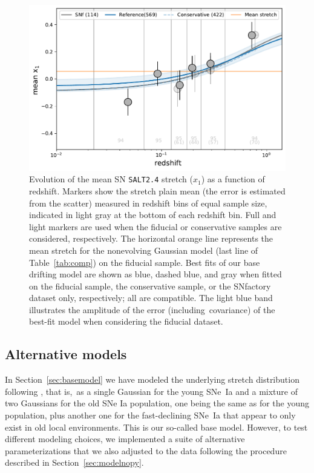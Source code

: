 \documentclass[]{aa}
\begin{document}
\begin{figure}
    \centering
    \includegraphics[width=0.7\linewidth]{Article_figures/stretchevol_all_vs_snf-mean.pdf}
    \caption{Evolution of the mean SN \textsc{\texttt{SALT2.4}} stretch ($x_1$)
        as a function of redshift. Markers show the stretch plain mean
        (the error is estimated from the scatter) measured in redshift bins of equal
        sample size, indicated in light gray at the bottom of each redshift bin.
        Full and light markers are used when the fiducial or conservative samples are considered, respectively. The horizontal orange line
        represents the mean stretch for the nonevolving Gaussian model
        (last line of Table~\ref{tab:comp}) on the fiducial sample. Best
        fits of our base drifting model are shown as blue, dashed blue, and
        gray when fitted on the fiducial sample, the conservative sample, or
        the SNfactory dataset only, respectively; all are compatible. The
        light blue band illustrates the amplitude of the error (including\
        covariance) of the best-fit model when considering the fiducial
    dataset.}
    \label{fig:modelall}
\end{figure}

\subsection{Alternative models}\label{sec:othermodel}

In Section~\ref{sec:basemodel} we have modeled the underlying stretch
distribution following \cite{rigault2020}, that is,\ as a single Gaussian for the
young SNe~Ia and a mixture of two Gaussians for the old SNe Ia
population, one being the same as for the young population, plus another one for
the fast-declining SNe~Ia that appear to only exist in old local environments.
This is our so-called base model. However, to test different modeling
choices, we implemented a suite of alternative parameterizations that we
also adjusted to the data following the procedure described in
Section~\ref{sec:modelnopy}. 
\end{document}
